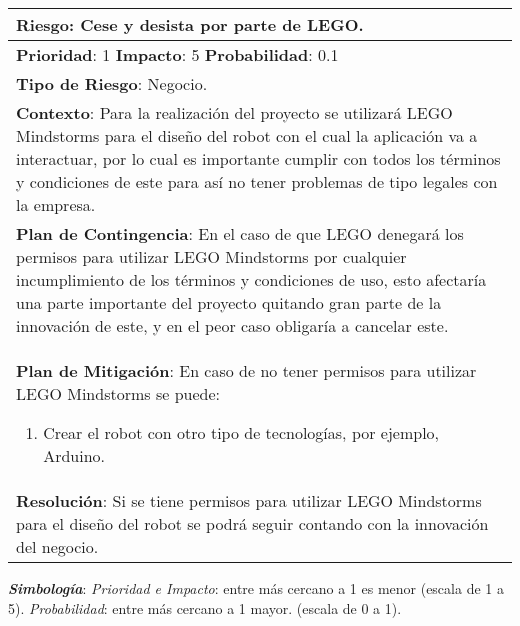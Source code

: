 \begin{table}[H]
  \centering
  \begin{tabular}{|p{15cm}|}\hline
    {\bf Riesgo}: Cese y desista por parte de LEGO.\\\hline
    {\bf Prioridad}: 1  {\bf Impacto}: 5  {\bf Probabilidad}: 0.1\\\hline
    {\bf Tipo de Riesgo}: Negocio.\\\hline
    {\bf Contexto}: Para la realización del proyecto  se utilizará LEGO Mindstorms para el diseño del robot con el cual la aplicación va a interactuar, por lo cual es importante cumplir con todos los términos y condiciones de este para así no tener problemas de tipo legales con la empresa.\\\hline
    {\bf Plan de Contingencia}: En el caso de que LEGO denegará los permisos para utilizar LEGO Mindstorms por cualquier incumplimiento de los términos y condiciones de uso, esto afectaría una parte importante del proyecto quitando gran parte de la innovación de este, y en el peor caso obligaría a cancelar este.\\\hline
    {\bf Plan de Mitigación}: En caso de no tener permisos para utilizar LEGO Mindstorms se puede:\begin{enumerate}\item Crear el robot con otro tipo de tecnologías, por ejemplo, Arduino.\end{enumerate}\\\hline
    {\bf Resolución}: Si se tiene permisos para utilizar LEGO Mindstorms para el diseño del robot se podrá seguir contando con la innovación del negocio.\\\hline
  \end{tabular}
  \label{table:R10}
\end{table}


\emph{\bf Simbología}: 
\emph{Prioridad e Impacto}: entre más cercano a 1 es menor (escala de  1 a  5). 
\emph{Probabilidad}: entre más cercano a 1 mayor. (escala de 0 a 1).

